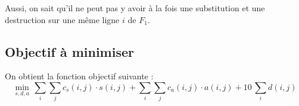 \documentclass[a4paper, 10pt, french]{article}
\begin{document}
\noindent Aussi, on sait qu'il ne peut pas y avoir à la fois une substitution et une destruction sur une même ligne $i$ de $F_1$.
\\

\subsection*{Objectif à minimiser}

On obtient la fonction objectif suivante :
\begin{equation*}
\min_{s, d, a} \, \sum\limits_i \sum\limits_j c_s(i, j) \cdot s(i, j) + \sum\limits_i \sum\limits_j c_a(i, j) \cdot a(i, j) + 10 \, \sum\limits_i d(i, j)
\end{equation*}





\end{document}
